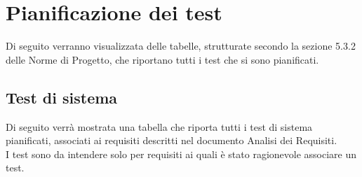 \newpage
\section{Pianificazione dei test}
Di seguito verranno visualizzata delle tabelle, strutturate secondo la sezione 5.3.2 delle Norme di Progetto, che riportano tutti i test che si sono pianificati. \\
\subsection{Test di sistema}
Di seguito verrà mostrata una tabella che riporta tutti i test di sistema pianificati, associati ai requisiti descritti nel documento Analisi dei Requisiti.\\
I test sono da intendere solo per requisiti ai quali è stato ragionevole associare un test.
